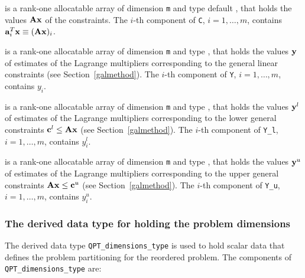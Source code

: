 \documentclass{galahad}
\begin{document}
\begin{description}
 is a rank-one allocatable array of dimension {\tt m} and type default 
\realdp, that holds
the values ${\mathbf{A}} {\mathbf{x}}$ of the constraints.
The $i$-th component of {\tt C}, $i = 1,  \ldots ,  m$, contains 
${\mathbf{a}}_{i}^{T}{\mathbf{x}} \equiv ({\mathbf{A}} {\mathbf{x}})_{i}$.  

 is a rank-one allocatable array of dimension {\tt m} and type 
\realdp, that holds
the values ${\mathbf{y}}$ of estimates  of the Lagrange multipliers
corresponding to the general linear constraints (see Section~\ref{galmethod}).
The $i$-th component of {\tt Y}, $i = 1,  \ldots ,  m$, contains $y_{i}$.  

 is a rank-one allocatable array of dimension {\tt m} and 
type \realdp, that holds
the values ${\mathbf{y}}^{l}$ of estimates  of the Lagrange multipliers
corresponding to the lower general constraints ${\mathbf{c}}^{l} \leq {\mathbf{A}} {\mathbf{x}}$
(see Section~\ref{galmethod}).
The $i$-th component of {\tt Y\_l}, $i = 1,  \ldots ,  m$, 
contains $y_{i}^{l}$.  

 is a rank-one allocatable array of dimension {\tt m} and 
type \realdp, that holds
the values ${\mathbf{y}}^{u}$ of estimates  of the Lagrange multipliers
corresponding to the upper general constraints ${\mathbf{A}} {\mathbf{x}} \leq {\mathbf{c}}^{u}$
(see Section~\ref{galmethod}).
The $i$-th component of {\tt Y\_u}, $i = 1,  \ldots ,  m$, 
contains $y_{i}^{u}$.  

\end{description}



\subsubsection{The derived data type for holding the problem dimensions}
\label{typeprob}
The derived data type 
{\tt QPT\_dimensions\_type} 
is used to hold scalar data that defines the problem partitioning for the
reordered problem. 
The components of 
{\tt QPT\_dimensions\_type} 
are:
\end{document}
